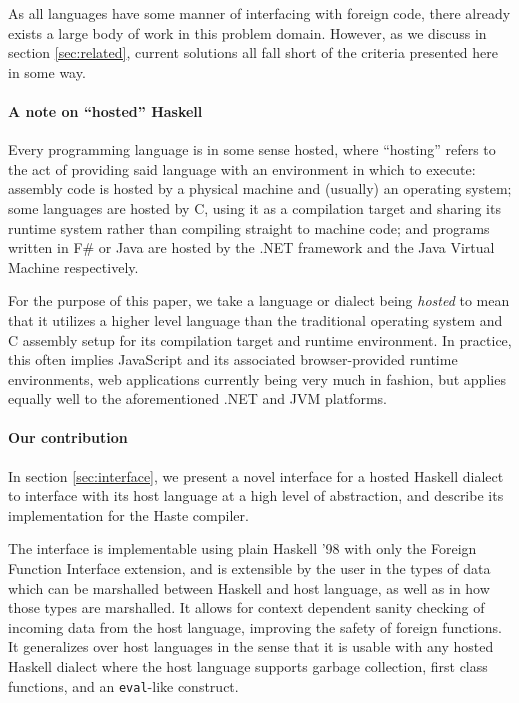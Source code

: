 \documentclass[preprint]{sigplanconf}
\begin{document}
As all languages have some manner of interfacing with foreign code, there
already exists a large body of work in this problem domain. However, as
we discuss in section \ref{sec:related}, current solutions all fall short of
the criteria presented here in some way.

\paragraph{A note on ``hosted'' Haskell}
Every programming language is in some sense hosted, where ``hosting'' refers
to the act of providing said language with an environment in which to execute:
assembly code is hosted by a physical machine and (usually) an operating
system; some languages are hosted by C, using it as a compilation target and
sharing its runtime system rather than compiling straight to machine code;
and programs written in F\# or Java are hosted by the .NET framework and the
Java Virtual Machine respectively.

For the purpose of this paper, we take a language or dialect being
\emph{hosted} to mean that it utilizes a higher level language than the
traditional operating system and C assembly setup for its compilation target
and runtime environment. In practice, this often implies JavaScript and its
associated browser-provided runtime environments, web applications currently
being very much in fashion, but applies equally well to the aforementioned
.NET and JVM platforms.

\paragraph{Our contribution}\label{sec:contrib}
In section \ref{sec:interface}, we present a novel interface for a hosted
Haskell dialect to interface with its host language at a high level of
abstraction, and describe its implementation for the Haste compiler.
\ \cite{haste}

The interface is implementable using plain Haskell '98 with only the Foreign
Function Interface extension, and is extensible by the user in the types of
data which can be marshalled between Haskell and host language, as well as in
how those types are marshalled. It allows for context dependent sanity
checking of incoming data from the host language, improving the safety
of foreign functions. It generalizes over host languages in the sense that it
is usable with any hosted Haskell dialect where the host language supports
garbage collection, first class functions, and an \lstinline!eval!-like
construct.
\end{document}
